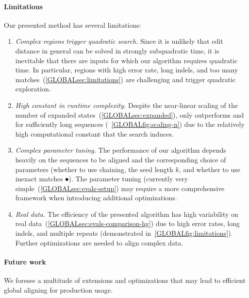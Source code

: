 \paragraph{Limitations}
Our presented method has several limitations:
\begin{enumerate}
  \item \emph{Complex regions trigger quadratic search.} Since it is unlikely
        that edit distance in general can be solved in strongly subquadratic
        time, it is inevitable that there are inputs for which our algorithm
        requires quadratic time.  In particular, regions with high error rate,
        long indels, and too many matches~(\cref{GLOBALsec:limitations}) are
        challenging and trigger quadratic exploration.
  \item \emph{High constant in runtime complexity.} Despite the near-linear
        scaling of the number of expanded states~(\cref{GLOBALsec:expanded}),
        \astarpa only outperforms \edlib and \wfa for sufficiently long sequences
        (~\cref{GLOBALfig:scaling-n}) due to the relatively high computational constant
        that the \A search induces.
  \item \emph{Complex parameter tuning.} The performance of our algorithm
        depends heavily on the sequences to be aligned and the corresponding choice of
        parameters (whether to use chaining, the seed length $k$, and whether to use
        inexact matches $\spot$). The parameter tuning (currently
        very simple~(\cref{GLOBALsec:evals-setup}) may require a more comprehensive
        framework when introducing additional optimizations.
  \item \emph{Real data.} The efficiency of the presented algorithm has high
        variability on real data~(\cref{GLOBALsec:evals-comparison-hg}) due to high
        error rates, long indels, and multiple repeats (demonstrated
        in~\cref{GLOBALfig:limitations}). Further optimizations are needed to align
        complex data.
\end{enumerate}

\paragraph{Future work}
We foresee a multitude of extensions and optimizations that may lead to
efficient global aligning for production usage.

